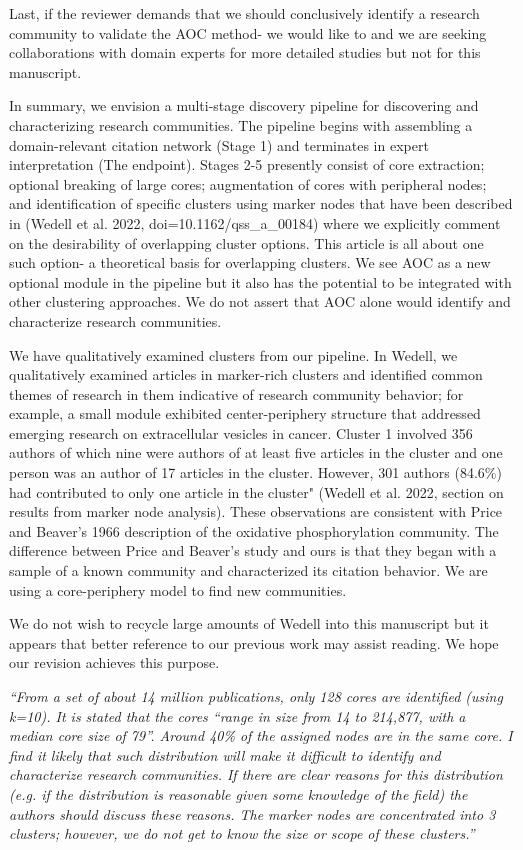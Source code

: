 \documentclass[11pt, oneside]{article}   	%
\begin{document}
Last, if the reviewer demands that we should conclusively identify a research community to validate the AOC method- we would like to and we are seeking collaborations with domain experts for more detailed studies but not for this manuscript.

In summary, we envision a multi-stage discovery pipeline for discovering and characterizing research communities. The pipeline begins with assembling a domain-relevant citation network (Stage 1) and terminates in expert interpretation (The endpoint). Stages 2-5 presently consist of core extraction; optional breaking of large cores; augmentation of cores with peripheral nodes; and identification of specific clusters using marker nodes that have been described in (Wedell et al. 2022, doi=10.1162/qss\_a\_00184) where we explicitly comment on the desirability of overlapping cluster options. This article is all about one such option- a theoretical basis for overlapping clusters. We see AOC as a new optional module in the pipeline but it also has the potential to be integrated with other clustering approaches. We do not assert that AOC alone would identify and characterize research communities.

We have qualitatively examined clusters from our pipeline. In Wedell, we qualitatively examined articles in marker-rich clusters and identified common themes of research in them indicative of research community behavior; for example, a small module exhibited center-periphery structure that addressed emerging research on extracellular vesicles in cancer. Cluster 1 involved 356 authors of which nine were authors of at least five articles in the cluster and one person was an author of 17 articles in the cluster. However, 301 authors (84.6\%) had contributed to only one article in the cluster" (Wedell et al. 2022, section on results from marker node analysis). These observations are consistent with Price and Beaver's 1966 description of the oxidative phosphorylation community. The difference between Price and Beaver's study and ours is that they began with a sample of a known community and characterized its citation behavior. We are using a core-periphery model to find new communities.

We do not wish to recycle large amounts of Wedell into this manuscript but it appears that better reference to our previous work may assist reading. We hope our revision achieves this purpose. 

\emph{``From a set of about 14 million publications, only 128 cores are identified (using k=10). It is stated that the cores “range in size from 14 to 214,877, with a median core size of 79”. Around 40\% of the assigned nodes are in the same core. I find it likely that such distribution will make it difficult to identify and characterize research communities. If there are clear reasons for this distribution (e.g. if the distribution is reasonable given some knowledge of the field) the authors should discuss these reasons. The marker nodes are concentrated into 3 clusters; however, we do not get to know the size or scope of these clusters.''}
\end{document}
